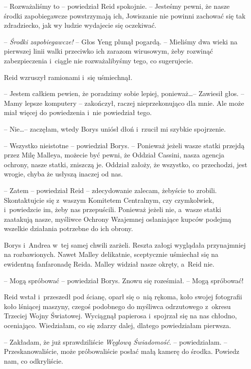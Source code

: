 \documentclass[oneside,polish,11pt,sfheadings]{mwbk}
\begin{document}
-- Rozważaliśmy to -- powiedział Reid spokojnie. -- Jesteśmy pewni, że
nasze środki zapobiegawcze powstrzymają ich, Jowiszanie nie powinni
zachować się tak zdradziecko, jak wy ludzie wydajecie się oczekiwać.

-- \textit{Środki zapobiegawcze!} -- Głos Yeng plunął pogardą. -- Mieliśmy dwa wieki na pierwszej linii walki przeciwko ich zarazom wirusowym, żeby
rozwinąć zabezpieczenia i~ciągle nie rozważalibyśmy tego, co
sugerujecie.

Reid wzruszył ramionami i~się uśmiechnął. 

-- Jestem całkiem pewien, że
poradzimy sobie lepiej, ponieważ\ldots  -- Zawiesił głos. -- Mamy lepsze
komputery -- zakończył, raczej nieprzekonująco dla mnie. Ale może miał
więcej do powiedzenia i~nie powiedział tego.

-- Nie\ldots  -- zaczęłam, wtedy Borys uniósł dłoń i~rzucił mi szybkie
spojrzenie.

-- Wszystko nieistotne -- powiedział Borys. -- Ponieważ jeżeli wasze statki
przejdą przez Milę Malleya, możecie być pewni, że Oddział Cassini, nasza
agencja ochrony, nasze statki, zniszczą je. Oddział założy, że wszystko,
co przechodzi, jest wrogie, chyba że usłyszą inaczej od nas.

-- Zatem -- powiedział Reid -- zdecydowanie zalecam, żebyście to zrobili.
Skontaktujcie się z~waszym Komitetem Centralnym, czy czymkolwiek, i~powiedzcie im, żeby nas przepuścili. Ponieważ jeżeli nie, a~wasze statki
zaatakują nasze, myśliwce Ochrony Wzajemnej osłaniające kupców podejmą
wszelkie działania potrzebne do ich obrony.

Borys i~Andrea w~tej samej chwili zarżeli. Reszta załogi wyglądała
przynajmniej na rozbawionych. Nawet Malley delikatnie, sceptycznie
uśmiechał się na ewidentną fanfaronadę Reida. Malley widział nasze
okręty, a~Reid nie.

-- Mogą spróbować -- powiedział Borys. Znowu się roześmiał. -- Mogą
spróbować!

Reid wstał i~przeszedł pod ścianę, oparł się o~nią rękoma, koło swojej
fotografii koło lśniącej maszyny, czegoś podobnego do myśliwca
odrzutowego z~okresu Trzeciej Wojny Światowej. Wyciągnął papierosa i~spojrzał się na nas chłodno, oceniająco. Wiedziałam, co się zdarzy
dalej, dlatego powiedziałam pierwsza.

-- Zakładam, że już sprawdziliście \textit{Węglową Świadomość}. -- powiedziałam. -- Przeskanowaliście, może próbowaliście posłać małą kamerę
do środka. Powiedz nam, co odkryliście.
\end{document}
